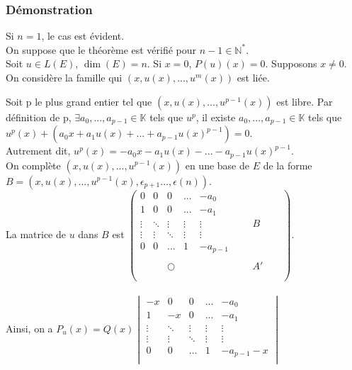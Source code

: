 \documentclass[a4paper,10pt]{book} %
\newcommand{\N}{\mathbb{N}}
\newcommand{\K}{\mathbb{K}}
\begin{document}
\subsubsection{Démonstration}
Si $n=1$, le cas est évident.\\

On suppose que le théorème est vérifié pour $n-1\in \N^*$.\\

Soit $u\in L(E)$, $\dim(E)=n$. Si $x=0$, $P(u)(x)=0$. Supposons $x\neq 0$.\\

On considère la famille qui $(x,u(x),...,u^m(x))$ est liée. 

Soit p le plus grand entier tel que $(x,u(x),...,u^{p-1}(x))$ est libre. Par définition de p, $\exists a_0,...,a_{p-1} \in\K$ tels que $u^p$, il existe $a_0,...,a_{p-1}\in \K$ tels que $u^p(x)+(a_0x+a_1u(x)+...+a_{p-1}u(x)^{p-1})=0$.\\

Autrement dit, $u^p(x)=-a_0x-a_1u(x)-...-a_{p-1} u(x)^{p-1}$.\\

On complète $(x,u(x),...,u^{p-1}(x))$ en une base de $E$ de la forme $B=(x,u(x),...,u^{p-1}(x), \epsilon_{p+1}...,\epsilon(n))$.\\

La matrice de $u$ dans $B$ est 
$\begin{pmatrix}
0&0&0&...&-a_0& & & & &\\
1&0&0&...&-a_{1}\\
\vdots&\ddots&\vdots&\vdots&\vdots& & &B\\
\vdots&\vdots&\ddots&\vdots&\vdots\\
0&0&...&1&-a_{p-1}\\
\\
& &\bigcirc& & & & &A'\\
\\
\end{pmatrix}$.\\\\

Ainsi, on a
$P_u(x)=Q(x)\begin{vmatrix}
-x&0&0&...&-a_0\\
1&-x&0&...&-a_{1}\\
\vdots&\ddots&\vdots&\vdots&\vdots\\
\vdots&\vdots&\ddots&\vdots&\vdots\\
0&0&...&1&-a_{p-1}-x\\
\end{vmatrix}$\\\\
\end{document}
